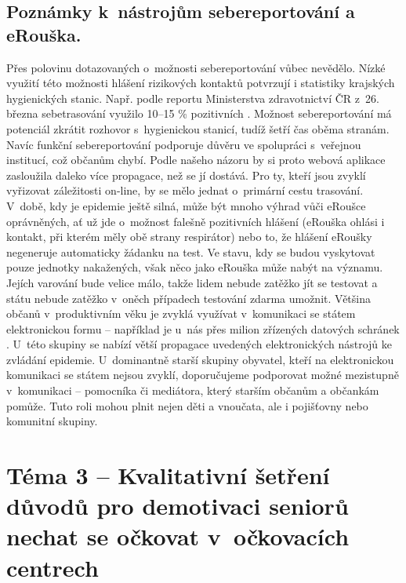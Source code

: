 \subsection*{Poznámky k~nástrojům sebereportování a eRouška.}
Přes polovinu dotazovaných o~možnosti sebereportování vůbec nevědělo. Nízké vy\-uži\-tí této možnosti hlášení rizikových kontaktů potvrzují i statistiky krajských hygienických stanic. Např. podle reportu Ministerstva zdravotnictví ČR z~26. března sebetrasování využilo 10–15 \% pozitivních \cite{MinisterstvoZdravotnictviCR2021}. Možnost sebereportování má potenciál zkrátit rozhovor s~hygienickou stanicí, tudíž šetří čas oběma stranám. Navíc funkční sebereportování podporuje důvěru ve spolupráci s~veřejnou institucí, což občanům chybí. Podle našeho názoru by si proto webová aplikace zasloužila daleko více propagace, než se jí dostává. Pro ty, kteří jsou zvyklí vyřizovat záležitosti on-line, by se mělo jednat o~primární cestu trasování. 
V~době, kdy je epidemie ještě silná, může být mnoho výhrad vůči eRoušce oprávněných, ať už jde o~možnost falešně pozitivních hlášení (eRouška ohlási i kontakt, při kterém měly obě strany respirátor) nebo to, že hlášení eRoušky negeneruje automaticky žádanku na test. Ve stavu, kdy se budou vyskytovat pouze jednotky nakažených, však něco jako eRouška může nabýt na významu. Jejích varování bude velice málo, takže lidem nebude zatěžko jít se testovat a státu nebude zatěžko v~oněch případech testování zdarma umožnit. 
Většina občanů v~produktivním věku je zvyklá využívat v~komunikaci se státem elektronickou formu – například je u~nás přes milion zřízených datových schránek \cite{DatoveSchranky2021}. U~této skupiny se nabízí větší propagace uvedených elektronických nástrojů ke zvládání epidemie. U~dominantně starší skupiny obyvatel, kteří na elektronickou komunikaci se státem nejsou zvyklí, doporučujeme podporovat možné mezistupně v~komunikaci – pomocníka či mediátora, který starším občanům a občankám pomůže. Tuto roli mohou plnit nejen děti a vnoučata, ale i pojišťovny nebo komunitní skupiny. 

\section*{Téma 3 -- Kvalitativní šetření důvodů pro demotivaci seniorů nechat se očkovat v~očkovacích centrech}

